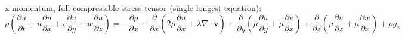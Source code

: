x-momentum, full compressible stress tensor (single longest equation):
\[ \rho \left( \frac{\partial u}{\partial t} + u \frac{\partial u}{\partial x} + v \frac{\partial u}{\partial y} + w \frac{\partial u}{\partial z} \right) = -\frac{\partial p}{\partial x} + \frac{\partial}{\partial x} \left( 2 \mu \frac{\partial u}{\partial x} + \lambda \nabla \cdot \mathbf{v} \right) + \frac{\partial}{\partial y} \left( \mu \frac{\partial u}{\partial y} + \mu \frac{\partial v}{\partial x} \right) + \frac{\partial}{\partial z} \left( \mu \frac{\partial u}{\partial z} + \mu \frac{\partial w}{\partial x} \right) + \rho g_x \]
